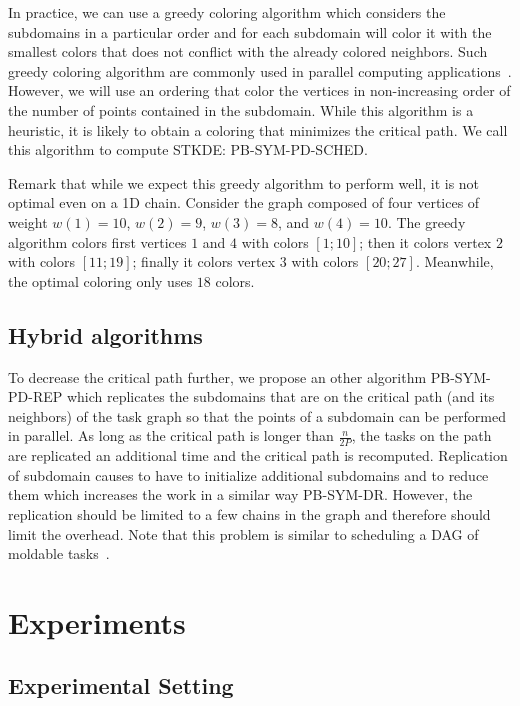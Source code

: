 \documentclass{article}
\begin{document}
In practice, we can use a greedy coloring algorithm which 
considers the subdomains in a particular order and for each subdomain
will color it with the smallest colors that does not conflict with the
already colored neighbors. Such greedy coloring algorithm are commonly
used in parallel computing applications~\cite{GMP05,Boman05-EuroPar,Deveci2016}. However, we will use
an ordering that color the vertices in non-increasing order of the
number of points contained in the subdomain. While this algorithm is a
heuristic, it is likely to obtain a coloring that minimizes the
critical path. We call this algorithm to compute STKDE:
PB-SYM-PD-SCHED.

Remark that while we expect this greedy algorithm to perform well, it
is not optimal even on a 1D chain. Consider the graph composed of four
vertices of weight $w(1)=10$, $w(2)=9$, $w(3)=8$, and $w(4)=10$. The
greedy algorithm colors first vertices $1$ and $4$ with colors
$[1;10]$; then it colors vertex $2$ with colors $[11;19]$; finally it
colors vertex $3$ with colors $[20;27]$. Meanwhile, the optimal
coloring only uses $18$ colors.


\subsection{Hybrid algorithms}
\label{sec:pb-sym-pd-rep}

To decrease the critical path further, we propose an other algorithm
PB-SYM-PD-REP which replicates the subdomains that are on the critical
path (and its neighbors) of the task graph so that the points of a
subdomain can be performed in parallel. As long as the critical path
is longer than $\frac{n}{2P}$, the tasks on the path are replicated an
additional time and the critical path is recomputed. Replication of
subdomain causes to have to initialize additional subdomains and to
reduce them which increases the work in a similar way
PB-SYM-DR. However, the replication should be limited to a few chains
in the graph and therefore should limit the overhead. Note that this
problem is similar to scheduling a DAG of moldable tasks~\cite{Lepere02,Hunold13}.

\section{Experiments}

\label{sec:experiments}

\subsection{Experimental Setting}
\end{document}
